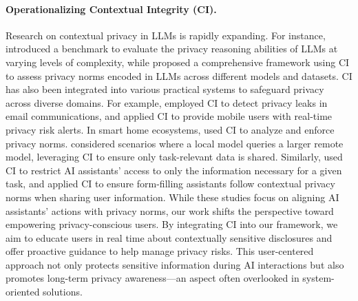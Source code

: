 \paragraph{Operationalizing Contextual Integrity (CI).}
Research on contextual privacy in LLMs is rapidly expanding. For instance, \citet{mireshghallah2023can} introduced a benchmark to evaluate the privacy reasoning abilities of LLMs at varying levels of complexity, while \citet{shvartzshnaider2024llm} proposed a comprehensive framework using CI to assess privacy norms encoded in LLMs across different models and datasets. CI has also been integrated into various practical systems to safeguard privacy across diverse domains. For example, \citet{shvartzshnaider2019vaccine} employed CI to detect privacy leaks in email communications, and \citet{kumar2020aquilis} applied CI to provide mobile users with real-time privacy risk alerts. In smart home ecosystems, \citet{malkin2022runtime,abdi2021privacy} used CI to analyze and enforce privacy norms. \citet{hartmann2024can} considered scenarios where a local model queries a larger remote model, leveraging CI to ensure only task-relevant data is shared. Similarly, \citet{bagdasaryan2024air} used CI to restrict AI assistants’ access to only the information necessary for a given task, and \citet{ghalebikesabi2024operationalizing} applied CI to ensure form-filling assistants follow contextual privacy norms when sharing user information. While these studies focus on aligning AI assistants' actions with privacy norms, our work shifts the perspective toward empowering privacy-conscious users. By integrating CI into our framework, we aim to educate users in real time about contextually sensitive disclosures and offer proactive guidance to help manage privacy risks. This user-centered approach not only protects sensitive information during AI interactions but also promotes long-term privacy awareness---an aspect often overlooked in system-oriented solutions.



